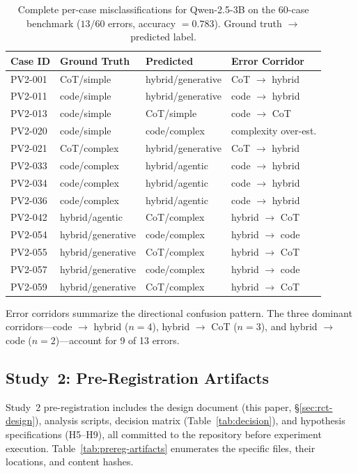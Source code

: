 \documentclass{article}
\begin{document}
\begin{table}[htbp]
\centering
\caption{Complete per-case misclassifications for Qwen-2.5-3B on the 60-case benchmark ($13/60$ errors, accuracy $= 0.783$). Ground truth $\to$ predicted label.}
\label{tab:confusion-errors}
\begin{tabular}{llll}
\toprule
Case ID & Ground Truth & Predicted & Error Corridor \\
\midrule
PV2-001 & CoT/simple & hybrid/generative & CoT $\to$ hybrid \\
PV2-011 & code/simple & hybrid/generative & code $\to$ hybrid \\
PV2-013 & code/simple & CoT/simple & code $\to$ CoT \\
PV2-020 & code/simple & code/complex & complexity over-est. \\
PV2-021 & CoT/complex & hybrid/generative & CoT $\to$ hybrid \\
PV2-033 & code/complex & hybrid/agentic & code $\to$ hybrid \\
PV2-034 & code/complex & hybrid/agentic & code $\to$ hybrid \\
PV2-036 & code/complex & hybrid/agentic & code $\to$ hybrid \\
PV2-042 & hybrid/agentic & CoT/complex & hybrid $\to$ CoT \\
PV2-054 & hybrid/generative & code/complex & hybrid $\to$ code \\
PV2-055 & hybrid/generative & CoT/complex & hybrid $\to$ CoT \\
PV2-057 & hybrid/generative & code/complex & hybrid $\to$ code \\
PV2-059 & hybrid/generative & CoT/complex & hybrid $\to$ CoT \\
\bottomrule
\end{tabular}

\smallskip
{\footnotesize Error corridors summarize the directional confusion pattern. The three dominant corridors---code $\to$ hybrid ($n = 4$), hybrid $\to$ CoT ($n = 3$), and hybrid $\to$ code ($n = 2$)---account for 9 of 13 errors.}
\end{table}

\subsection{Study~2: Pre-Registration Artifacts}
\label{app:prereg}

Study~2 pre-registration includes the design document (this paper, \S\ref{sec:rct-design}), analysis scripts, decision matrix (Table~\ref{tab:decision}), and hypothesis specifications (H5--H9), all committed to the repository before experiment execution. Table~\ref{tab:prereg-artifacts} enumerates the specific files, their locations, and content hashes.
\end{document}
